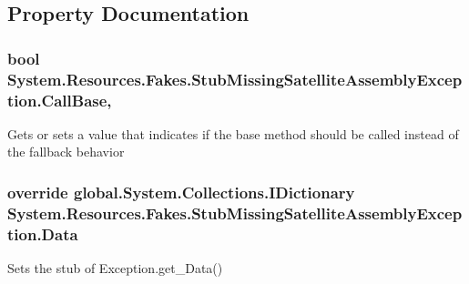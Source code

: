 \subsection{Property Documentation}
\hypertarget{class_system_1_1_resources_1_1_fakes_1_1_stub_missing_satellite_assembly_exception_abb372d063f03614b47a291b1e649c7de}{
\subsubsection[{Call\-Base}]{\setlength{\rightskip}{0pt plus 5cm}bool System.\-Resources.\-Fakes.\-Stub\-Missing\-Satellite\-Assembly\-Exception.\-Call\-Base\hspace{0.3cm}{\ttfamily [get]}, {\ttfamily [set]}}}\label{class_system_1_1_resources_1_1_fakes_1_1_stub_missing_satellite_assembly_exception_abb372d063f03614b47a291b1e649c7de}


Gets or sets a value that indicates if the base method should be called instead of the fallback behavior

\hypertarget{class_system_1_1_resources_1_1_fakes_1_1_stub_missing_satellite_assembly_exception_af972e4034bb6a6108203d32108742f25}{
\subsubsection[{Data}]{\setlength{\rightskip}{0pt plus 5cm}override global.\-System.\-Collections.\-I\-Dictionary System.\-Resources.\-Fakes.\-Stub\-Missing\-Satellite\-Assembly\-Exception.\-Data\hspace{0.3cm}{\ttfamily [get]}}}\label{class_system_1_1_resources_1_1_fakes_1_1_stub_missing_satellite_assembly_exception_af972e4034bb6a6108203d32108742f25}


Sets the stub of Exception.\-get\-\_\-\-Data()

